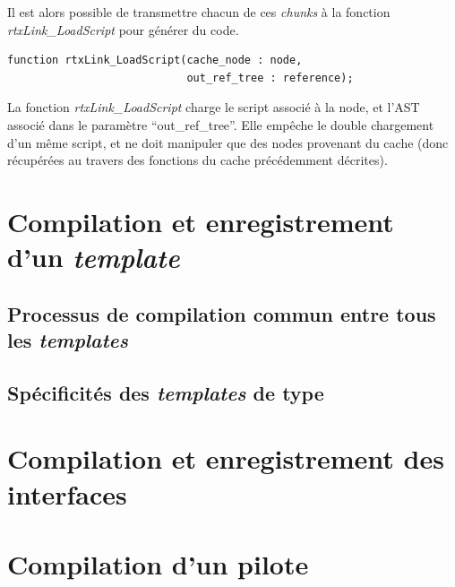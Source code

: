 \documentclass[french]{rtxreport}
\begin{document}
Il est alors possible de transmettre chacun de ces \emph{chunks} à la fonction
\emph{rtxLink\_LoadScript} pour générer du code.


\begin{lstlisting}
function rtxLink_LoadScript(cache_node : node,
                            out_ref_tree : reference);
\end{lstlisting}
La fonction \emph{rtxLink\_LoadScript} charge le script associé à la node, et
l'AST associé dans le paramètre ``out\_ref\_tree''. Elle empêche le
double chargement d'un même script, et ne doit manipuler que des nodes
provenant du cache (donc récupérées au travers des fonctions du cache
précédemment décrites).



\section{Compilation et enregistrement d'un \emph{template}}
\subsection{Processus de compilation commun entre tous les \emph{templates}}
\subsection{Spécificités des \emph{templates} de type}

\section{Compilation et enregistrement des interfaces}


\section{Compilation d'un pilote}
\end{document}
